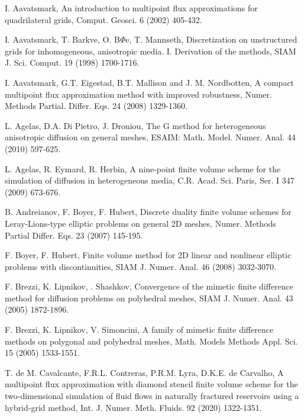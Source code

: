 \documentclass[times,review,preprint,authoryear]{elsarticle}
\begin{document}
\begin{thebibliography}{100}

I. Aavatsmark, An introduction to multipoint flux approximations for quadrilateral grids, Comput. Geosci. 6 (2002) 405-432.


I. Aavatsmark, T. Barkve, O. B$\Phi$e, T. Mannseth, Discretization on unstructured grids for inhomogeneous, anisotropic media. I. Derivation of the methods, SIAM J. Sci. Comput. 19 (1998) 1700-1716.

I. Aavatsmark, G.T. Eigestad, B.T. Mallison and J. M. Nordbotten, A compact multipoint flux approximation method with improved robustness, Numer. Methods Partial. Differ. Eqs. 24 (2008) 1329-1360.

L. Agelas, D.A. Di Pietro, J. Droniou, The G method for heterogeneous anisotropic diffusion on general meshes, ESAIM: Math. Model. Numer. Anal. 44 (2010) 597-625.

L. Agelas, R. Eymard, R. Herbin, A nine-point finite volume scheme for the simulation of diffusion in heterogeneous media, C.R. Acad. Sci. Paris, Ser. I 347 (2009) 673-676.

B. Andreianov, F. Boyer, F. Hubert, Discrete duality finite volume schemes for Leray-Lions-type elliptic problems on general 2D meshes, Numer. Methods Partial Differ. Eqs. 23 (2007) 145-195.

F. Boyer, F. Hubert, Finite volume method for 2D linear and nonlinear elliptic problems with discontinuities, SIAM J. Numer. Anal. 46 (2008)
3032-3070.

F. Brezzi, K. Lipnikov, . Shashkov, Convergence of the mimetic finite difference method for diffusion problems on polyhedral meshes, SIAM J. Numer. Anal. 43 (2005) 1872-1896.

F. Brezzi, K. Lipnikov, V. Simoncini, A family of mimetic finite difference methods on polygonal and polyhedral meshes, Math. Models Methods Appl. Sci. 15 (2005) 1533-1551.

T. {\color{black}de} M. Cavalcante, F.R.L. Contreras, P.R.M. Lyra, D.K.E. de Carvalho, A multipoint flux
approximation with diamond stencil finite volume scheme for the two-dimensional simulation of fluid flows in naturally fractured reservoirs using a hybrid-grid method, Int. J. Numer. Meth. Fluids. 92 (2020) 1322-1351.


\end{thebibliography}
\end{document}
